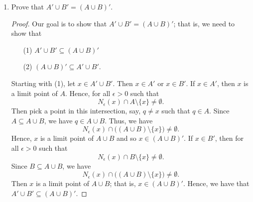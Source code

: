 \documentclass[a4paper]{article}
\begin{document}
\begin{enumerate}
\begin{enumerate}
\begin{proof}
                Our goal is to show that \( \overline{A \cap B} \subseteq \overline{A} \cap \overline{B} \). Let \( x \in \overline{A \cap B} \). Then either \( x \in A \cap B  \) or \( x \in (A \cap B)' \). Suppose \( x \in A \cap  B  \). Then both \( x \in A  \) and \( x \in  B \) and so \( x \in \overline{A} \) and \( x \in \overline{B} \) since \( A \subseteq  \overline{A} \) and \( B \subseteq \overline{B} \). Now, suppose \( x \in (A \cap B)' \). Then \( x  \) is a limit point of \( A \cap B  \); that is, for all \( \epsilon > 0  \), \( {N}_{\epsilon}(x) \cap (A \cap B) \setminus  \{ x \} \neq \emptyset \). Since \( A \cap B \subseteq  A  \) and \( A \cap B \subseteq  B  \), we must have that
                \[  {N}_{\epsilon}(x) \cap A \setminus  \{ x \} \neq \emptyset  \tag{1}\]
                and 
                \[  {N}_{\epsilon}(x) \cap B \setminus  \{ x \} \neq \emptyset. \tag{2}  \]
                Thus, (1) and (2) imply that \( x \in A'   \) and \( x \in B'  \) meaning that \( x  \) is both a limit of point of \( A  \) and \(  B \). Hence, \( x \in \overline{A}  \) and \( x \in \overline{B} \). Thus, we have \( \overline{A \cap B} \subseteq \overline{A} \cap \overline{B} \) in both of these cases.
                \end{proof}
            \item Prove that \( A' \cup B' = (A \cup B)' \).
                \begin{proof}
                Our goal is to show that \( A' \cup B' = (A \cup B)' \); that is, we need to show that
                \begin{enumerate}
                    \item[(1)] \( A' \cup B' \subseteq  (A \cup B)' \)
                    \item[(2)] \( (A \cup B)' \subseteq  A' \cup B' \).
                \end{enumerate}
                Starting with (1), let \( x \in A' \cup B' \). Then \( x \in A' \) or \( x \in B' \). If \( x \in A' \), then \( x  \) is a limit point of \( A  \). Hence, for all \( \epsilon > 0  \) such that 
                \[  {N}_{\epsilon}(x) \cap A \setminus  \{ x \} \neq \emptyset. \]
                Then pick a point in this intersection, say, \( q \neq x  \) such that \( q \in A  \). Since \( A \subseteq  A \cup B  \), we have \( q \in A \cup B \). Thus, we have 
                \[  {N}_{\epsilon}(x) \cap \Big( (A \cup  B) \setminus  \{ x \} \Big) \neq \emptyset. \]
                Hence, \( x  \) is a limit point of \( A \cup B \) and so \( x \in (A \cup B)' \). If \( x \in B' \), then for all \( \epsilon > 0  \) such that  
                \[  {N}_{\epsilon}(x) \cap B \setminus  \{ x \} \neq \emptyset.  \]
                Since \( B \subseteq A \cup B \), we have
                \[  {N}_{\epsilon}(x) \cap \Big( (A \cup B) \setminus  \{ x \} \Big) \neq \emptyset. \]
                Then \( x  \) is a limit point of \( A \cup B \); that is, \( x \in (A \cup B)' \). Hence, we have that \( A' \cup B' \subseteq  (A \cup B)' \).


\end{proof}
\end{enumerate}
\end{enumerate}
\end{document}
